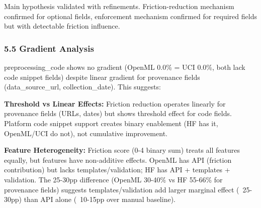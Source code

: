 Main hypothesis validated with refinements. Friction-reduction mechanism confirmed for optional fields, enforcement mechanism confirmed for required fields but with detectable friction influence.

\subsubsection{5.5 Gradient Analysis}

preprocessing\_code shows no gradient (OpenML 0.0\% = UCI 0.0\%, both lack code snippet fields) despite linear gradient for provenance fields (data\_source\_url, collection\_date). This suggests:

\textbf{Threshold vs Linear Effects:} Friction reduction operates linearly for provenance fields (URLs, dates) but shows threshold effect for code fields. Platform code snippet support creates binary enablement (HF has it, OpenML/UCI do not), not cumulative improvement.

\textbf{Feature Heterogeneity:} Friction score (0-4 binary sum) treats all features equally, but features have non-additive effects. OpenML has API (friction contribution) but lacks templates/validation; HF has API + templates + validation. The 25-30pp difference (OpenML 30-40\% vs HF 55-66\% for provenance fields) suggests templates/validation add larger marginal effect (~25-30pp) than API alone (~10-15pp over manual baseline).
